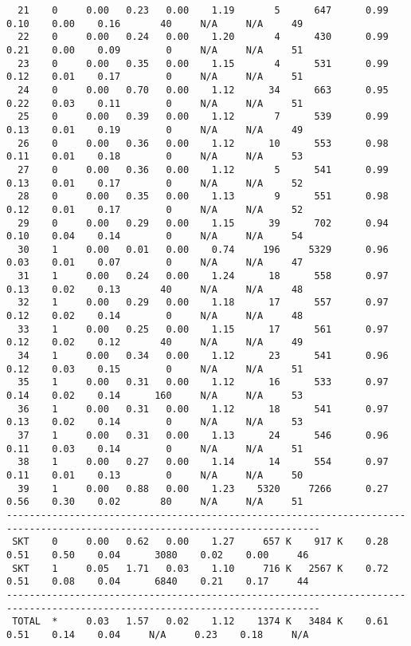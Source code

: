 \begin{lstlisting}
  21    0     0.00   0.23   0.00    1.19       5      647      0.99    0.10    0.00    0.16       40     N/A     N/A     49
  22    0     0.00   0.24   0.00    1.20       4      430      0.99    0.21    0.00    0.09        0     N/A     N/A     51
  23    0     0.00   0.35   0.00    1.15       4      531      0.99    0.12    0.01    0.17        0     N/A     N/A     51
  24    0     0.00   0.70   0.00    1.12      34      663      0.95    0.22    0.03    0.11        0     N/A     N/A     51
  25    0     0.00   0.39   0.00    1.12       7      539      0.99    0.13    0.01    0.19        0     N/A     N/A     49
  26    0     0.00   0.36   0.00    1.12      10      553      0.98    0.11    0.01    0.18        0     N/A     N/A     53
  27    0     0.00   0.36   0.00    1.12       5      541      0.99    0.13    0.01    0.17        0     N/A     N/A     52
  28    0     0.00   0.35   0.00    1.13       9      551      0.98    0.12    0.01    0.17        0     N/A     N/A     52
  29    0     0.00   0.29   0.00    1.15      39      702      0.94    0.10    0.04    0.14        0     N/A     N/A     54
  30    1     0.00   0.01   0.00    0.74     196     5329      0.96    0.03    0.01    0.07        0     N/A     N/A     47
  31    1     0.00   0.24   0.00    1.24      18      558      0.97    0.13    0.02    0.13       40     N/A     N/A     48
  32    1     0.00   0.29   0.00    1.18      17      557      0.97    0.12    0.02    0.14        0     N/A     N/A     48
  33    1     0.00   0.25   0.00    1.15      17      561      0.97    0.12    0.02    0.12       40     N/A     N/A     49
  34    1     0.00   0.34   0.00    1.12      23      541      0.96    0.12    0.03    0.15        0     N/A     N/A     51
  35    1     0.00   0.31   0.00    1.12      16      533      0.97    0.14    0.02    0.14      160     N/A     N/A     53
  36    1     0.00   0.31   0.00    1.12      18      541      0.97    0.13    0.02    0.14        0     N/A     N/A     53
  37    1     0.00   0.31   0.00    1.13      24      546      0.96    0.11    0.03    0.14        0     N/A     N/A     51
  38    1     0.00   0.27   0.00    1.14      14      554      0.97    0.11    0.01    0.13        0     N/A     N/A     50
  39    1     0.00   0.88   0.00    1.23    5320     7266      0.27    0.56    0.30    0.02       80     N/A     N/A     51
-----------------------------------------------------------------------------------------------------------------------------
 SKT    0     0.00   0.62   0.00    1.27     657 K    917 K    0.28    0.51    0.50    0.04      3080    0.02    0.00     46
 SKT    1     0.05   1.71   0.03    1.10     716 K   2567 K    0.72    0.51    0.08    0.04      6840    0.21    0.17     44
-----------------------------------------------------------------------------------------------------------------------------
 TOTAL  *     0.03   1.57   0.02    1.12    1374 K   3484 K    0.61    0.51    0.14    0.04     N/A     0.23    0.18     N/A
\end{lstlisting}


